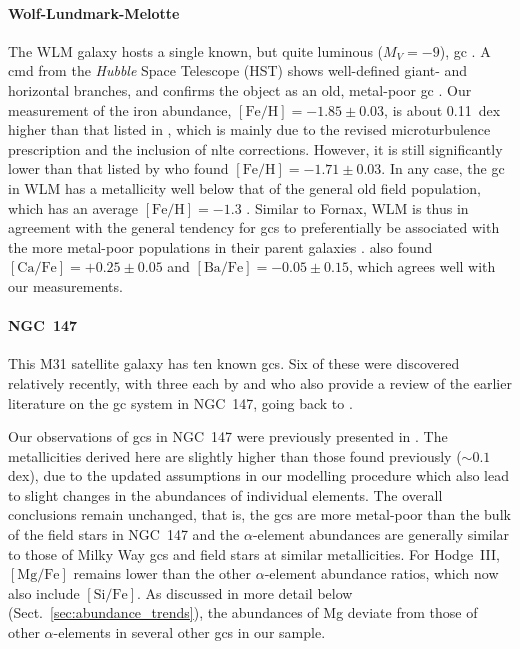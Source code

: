 \documentclass{aa}
\begin{document}
\paragraph{Wolf-Lundmark-Melotte} 

The WLM galaxy hosts a single known, but quite luminous ($M_V=-9$), \ac{gc} \citep{Humason1956,Sandage1985,Larsen2014}. A \ac{cmd} from the \textit{Hubble} Space Telescope (HST) shows well-defined giant- and horizontal branches, and confirms the object as an old, metal-poor \ac{gc} \citep{Hodge1999}. 
Our measurement of the iron abundance, $\mathrm{[Fe/H]}=-1.85\pm0.03$, is about 0.11~dex higher than that listed in \citet{Larsen2014}, which is mainly due to the revised microturbulence prescription and the inclusion of \ac{nlte} corrections. However, it is still significantly lower than that listed by \citet{Colucci2011} who found $\mathrm{[Fe/H]}=-1.71\pm0.03$. 
In any case, the \ac{gc} in WLM has a metallicity well below that of the general old field population, which has an average $\mathrm{[Fe/H]}=-1.3$ \citep{Leaman2013}. 
Similar to Fornax, WLM is thus in agreement with the general tendency for \acp{gc} to preferentially be associated with the more metal-poor populations in their parent galaxies \citep{Forte1981,Brodie1991,Harris2007,Lamers2017}.
\citet{Colucci2011} also found $\mathrm{[Ca/Fe]}=+0.25\pm0.05$ and $\mathrm{[Ba/Fe]}=-0.05\pm0.15$, which agrees well with our measurements. 

\paragraph{NGC~147}

This M31 satellite galaxy has ten known \acp{gc}. Six of these were discovered relatively recently, with three each by \citet{Sharina2009} and \citet{Veljanoski2013} who also provide a review of the earlier literature on the \ac{gc} system in NGC~147, going back to \citet{Baade1944a}. 

Our observations of \acp{gc} in NGC~147 were previously presented in \citet{Larsen2018}. 
The metallicities derived here are slightly higher than those found previously ($\sim0.1$ dex), due to the updated assumptions in our modelling procedure which also lead to slight changes in the abundances of individual elements. The overall conclusions remain unchanged, that is, the \acp{gc} are more metal-poor than the bulk of the field stars in NGC~147 and the $\alpha$-element abundances are generally similar to those of Milky Way \acp{gc} and field stars at similar metallicities. For Hodge~III,  $\mathrm{[Mg/Fe]}$  remains lower than the other $\alpha$-element abundance ratios, which now also include $\mathrm{[Si/Fe]}$. As discussed in more detail below (Sect.~\ref{sec:abundance_trends}), the abundances of Mg deviate from those of other $\alpha$-elements in several other \acp{gc} in our sample.
\end{document}
